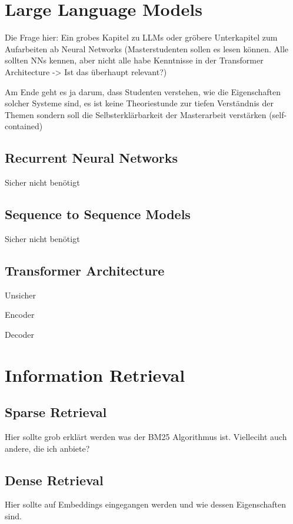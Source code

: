 \section{Large Language Models}

Die Frage hier: Ein grobes Kapitel zu LLMs oder gröbere Unterkapitel zum Aufarbeiten ab Neural Networks (Masterstudenten sollen es lesen können. Alle sollten NNs kennen, aber nicht alle habe Kenntnisse in der Transformer Architecture -> Ist das überhaupt relevant?)

Am Ende geht es ja darum, dass Studenten verstehen, wie die Eigenschaften solcher Systeme sind, es ist keine Theoriestunde zur tiefen Verständnis der Themen sondern soll die Selbsterklärbarkeit der Masterarbeit verstärken (self-contained)

\subsection{Recurrent Neural Networks}
Sicher nicht benötigt
\subsection{Sequence to Sequence Models}
Sicher nicht benötigt
\subsection{Transformer Architecture}
Unsicher

Encoder 

Decoder

\section{Information Retrieval}

\subsection{Sparse Retrieval}
Hier sollte grob erklärt werden was der BM25 Algorithmus ist. Vielleciht auch andere, die ich anbiete?

\subsection{Dense Retrieval}
Hier sollte auf Embeddings eingegangen werden und wie dessen Eigenschaften sind. 



